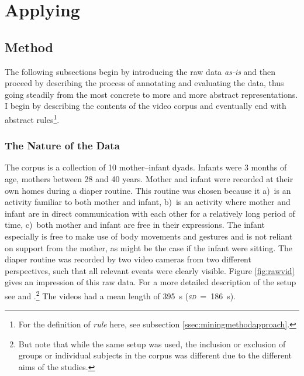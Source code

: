 
\chapter{Applying \fpmupper}
\label{ch:mining}

\section{Method}
\label{sec:miningmethod}
The following subsections begin by introducing the raw data \emph{as-is} and then proceed by describing the process of annotating and evaluating the data, thus going steadily from the most concrete to more and more abstract representations.
I begin by describing the contents of the video corpus and eventually end with abstract rules\footnote{For the definition of \emph{rule} here, see subsection \ref{ssec:miningmethodapproach}.}.

\subsection{The Nature of the Data}
\label{ssec:miningmethodnature}
The corpus is a collection of 10 mother--infant dyads.
Infants were 3 months of age, mothers between 28 and 40 years.
Mother and infant were recorded at their own homes during a diaper routine.
This routine was chosen because it a)~is an activity familiar to both mother and infant, b)~is an activity where mother and infant are in direct communication with each other for a relatively long period of time, c)~both mother and infant are free in their expressions.
The infant especially is free to make use of body movements and gestures and is not reliant on support from the mother, as might be the case if the infant were sitting.
The diaper routine was recorded by two video cameras from two different perspectives, such that all relevant events were clearly visible.
Figure \ref{fig:rawvid} gives an impression of this raw data.
For a more detailed description of the setup see \citet[]{nomikou17} and \citet[]{nomikou11}.\footnote{But note that while the same setup was used, the inclusion or exclusion of groups or individual subjects in the corpus was different due to the different aims of the studies.} The videos had a mean length of 395~s (\emph{\textsc{sd}}~=~186~s).


